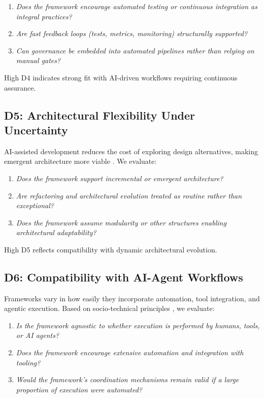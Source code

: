 \documentclass[11pt, a4paper, twocolumn]{article} %
\begin{document}
\begin{enumerate}[label=D4.\arabic*), leftmargin=*]
    \item \emph{Does the framework encourage automated testing or continuous
    integration as integral practices?}
    \item \emph{Are fast feedback loops (tests, metrics, monitoring) structurally
    supported?}
    \item \emph{Can governance be embedded into automated pipelines rather than
    relying on manual gates?}
\end{enumerate}

High D4 indicates strong fit with AI-driven workflows requiring continuous
assurance.

\subsection*{D5: Architectural Flexibility Under Uncertainty}

AI-assisted development reduces the cost of exploring design alternatives, making
emergent architecture more viable \citep{sanchez1996modular,larman2017less}. We
evaluate:

\begin{enumerate}[label=D5.\arabic*), leftmargin=*]
    \item \emph{Does the framework support incremental or emergent architecture?}
    \item \emph{Are refactoring and architectural evolution treated as routine
    rather than exceptional?}
    \item \emph{Does the framework assume modularity or other structures enabling
    architectural adaptability?}
\end{enumerate}

High D5 reflects compatibility with dynamic architectural evolution.

\subsection*{D6: Compatibility with AI-Agent Workflows}

Frameworks vary in how easily they incorporate automation, tool integration,
and agentic execution. Based on socio-technical principles
\citep{humble2015leanenterprise,ries2011lean}, we evaluate:

\begin{enumerate}[label=D6.\arabic*), leftmargin=*]
    \item \emph{Is the framework agnostic to whether execution is performed by
    humans, tools, or AI agents?}
    \item \emph{Does the framework encourage extensive automation and integration
    with tooling?}
    \item \emph{Would the framework's coordination mechanisms remain valid if a
    large proportion of execution were automated?}
\end{enumerate}
\end{document}
